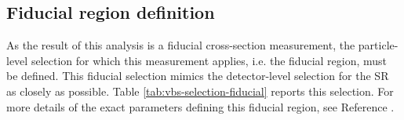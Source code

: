 \begin{table}[p]
\end{table}

\subsection{Fiducial region definition}

As the result of this analysis is a fiducial cross-section measurement, the
particle-level selection for which this measurement applies, i.e. the fiducial
region, must be defined.  This fiducial selection mimics the detector-level
selection for the \ac{SR} as closely as possible. Table
\ref{tab:vbs-selection-fiducial} reports this selection. For more details of the
exact parameters defining this fiducial region, see Reference \cite{VBSZy-CONF}.

